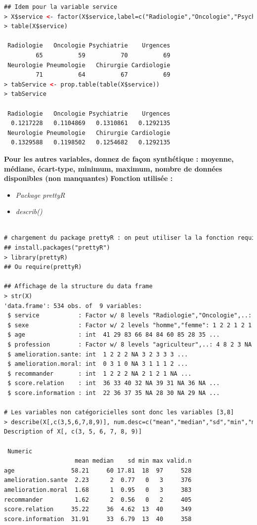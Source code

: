 \begin{lstlisting}[language=html]
## Idem pour la variable service
> X$service <- factor(X$service,label=c("Radiologie","Oncologie","Psychiatrie","Urgences","Neurologie","Pneumologie","Chirurgie","Cardiologie"))
> table(X$service)

 Radiologie   Oncologie Psychiatrie    Urgences 
         65          59          70          69 
 Neurologie Pneumologie   Chirurgie Cardiologie 
         71          64          67          69 
> tabService <- prop.table(table(X$service))
> tabService

 Radiologie   Oncologie Psychiatrie    Urgences 
  0.1217228   0.1104869   0.1310861   0.1292135 
 Neurologie Pneumologie   Chirurgie Cardiologie 
  0.1329588   0.1198502   0.1254682   0.1292135 
\end{lstlisting}

\textbf{Pour les autres variables, donnez de façon synthétique : moyenne, médiane,
écart-type, minimum, maximum, nombre de données disponibles (non manquantes)}
\textbf{Fonction utilisée : }
\begin{itemize}
\item \textit{Package prettyR}
\item \textit{describ()}
\end{itemize}

\begin{lstlisting}[language=html]

# chargement du package prettyR : on peut utiliser la la fonction require()
## install.packages("prettyR")
> library(prettyR)
## Ou require(prettyR)

## Affichage de la structure du data frame
> str(X)
'data.frame': 534 obs. of  9 variables:
 $ service           : Factor w/ 8 levels "Radiologie","Oncologie",..: 3 3 3 3 3 3 3 3 3 3 ...
 $ sexe              : Factor w/ 2 levels "homme","femme": 1 2 2 1 2 1 1 1 1 2 ...
 $ age               : int  41 29 83 66 84 84 60 85 28 35 ...
 $ profession        : Factor w/ 8 levels "agriculteur",..: 4 8 2 3 NA 6 3 3 3 3 ...
 $ amelioration.sante: int  1 2 2 2 NA 3 2 3 3 3 ...
 $ amelioration.moral: int  0 3 1 0 NA 3 1 1 1 2 ...
 $ recommander       : int  1 2 2 2 NA 2 1 2 1 NA ...
 $ score.relation    : int  36 33 40 32 NA 39 31 NA 36 NA ...
 $ score.information : int  22 36 37 35 NA 28 30 NA 29 NA ...

# Les variables non catégoricielles sont donc les variables [3,8]
> describe(X[,c(3,5,6,7,8,9)], num.desc=c("mean","median","sd","min","max","valid.n"))
Description of X[, c(3, 5, 6, 7, 8, 9)] 

 Numeric 
                    mean median    sd min max valid.n
age                58.21     60 17.81  18  97     528
amelioration.sante  2.23      2  0.77   0   3     376
amelioration.moral  1.68      1  0.95   0   3     383
recommander         1.62      2  0.56   0   2     405
score.relation     35.22     36  4.62  13  40     349
score.information  31.91     33  6.79  13  40     358

\end{lstlisting}

